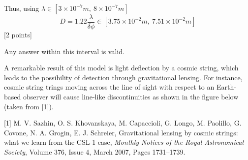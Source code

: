 \begin{description}
  Thus, using
  $\lambda\in[3\times 10^{-7}m,\ 8\times 10^{-7}m]$
  \[ D = 1.22\frac{\lambda}{\delta\phi}
     \in\left[3.75\times 10^{-2}m,\ 7.51\times 10^{-2}m\right] \]
  \hfill[2 points]

  Any answer within this interval is valid.

  A remarkable result of this model is light deflection by a cosmic
  string, which leads to the possibility of detection through
  gravitational lensing. For instance, cosmic string trings moving across
  the line of sight with respect to an Earth-based observer will cause
  line-like discontinuities as shown in the figure below (taken from
  [1]).

  [1] M. V. Sazhin, O. S. Khovanskaya, M. Capaccioli, G. Longo,
  M. Paolillo, G. Covone, N. A. Grogin, E. J. Schreier, Gravitational
  lensing by cosmic strings: what we learn from the CSL-1 case,
  \emph{Monthly Notices of the Royal Astronomical Society}, Volume 376,
  Issue 4, March 2007, Pages 1731--1739.
\end{description}
